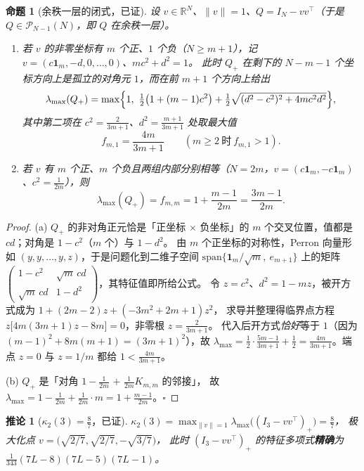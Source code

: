 \documentclass[UTF8,11pt]{ctexart}
\newtheorem{proposition}[theorem]{命题}
\newtheorem{corollary}[theorem]{推论}
\theoremstyle{definition}
\newcommand{\R}{\mathbb{R}}
\newcommand{\one}{\mathbf{1}}
\begin{document}
\begin{proposition}[余秩一层的闭式，已证]\label{prop:corank1}
设 $v\in\R^N$、$\|v\|=1$、$Q=I_N-vv^\top$（于是 $Q\in\mathcal P_{N-1}(N)$，即 $Q$ 在余秩一层）。
\begin{enumerate}[label=(\alph*),leftmargin=2.2em]
\item 若 $v$ 的非零坐标有 $m$ 个正、$1$ 个负（$N\ge m+1$），记 $v=(c\one_m,-d,0,\dots,0)$、$mc^2+d^2=1$。
此时 $Q_+$ 在剩下的 $N-m-1$ 个坐标方向上是孤立的对角元 $1$，而在前 $m+1$ 个方向上给出
\[
\lambda_{\max}(Q_+)=\max\Bigl\{1,\ \tfrac12\bigl(1+(m-1)c^2\bigr)+\tfrac12\sqrt{(d^2-c^2)^2+4mc^2d^2}\Bigr\},
\]
其中第二项在 $c^2=\frac2{3m+1}$、$d^2=\frac{m+1}{3m+1}$ 处取最大值
\begin{equation}\label{eq:fm1}
f_{m,1}=\frac{4m}{3m+1}\qquad(m\ge2\ \text{时}\ f_{m,1}>1).
\end{equation}
\item 若 $v$ 有 $m$ 个正、$m$ 个负且两组内部分别相等（$N=2m$，$v=(c\one_m,-c\one_m)$、$c^2=\frac1{2m}$），则
\begin{equation}\label{eq:fmm}
\lambda_{\max}(Q_+)=f_{m,m}=1+\frac{m-1}{2m}=\frac{3m-1}{2m}.
\end{equation}
\end{enumerate}
\end{proposition}

\begin{proof}
(a) $Q_+$ 的非对角正元恰是「正坐标 $\times$ 负坐标」的 $m$ 个交叉位置，值都是 $cd$；对角是 $1-c^2$（$m$ 个）与 $1-d^2$。
由 $m$ 个正坐标的对称性，Perron 向量形如 $(y,y,\dots,y,z)$，于是问题化到二维子空间
$\mathrm{span}\{\one_m/\sqrt m,\ e_{m+1}\}$ 上的矩阵
$\begin{pmatrix}1-c^2&\sqrt m\,cd\\ \sqrt m\,cd&1-d^2\end{pmatrix}$，其特征值即所给公式。
令 $z=c^2$、$d^2=1-mz$，被开方式成为 $1+(2m-2)z+(-3m^2+2m+1)z^2$，
求导并整理得临界点方程 $z\bigl[4m(3m+1)z-8m\bigr]=0$，非零根 $z=\frac2{3m+1}$。
代入后开方式\emph{恰好}等于 $1$（因为 $(m-1)^2+8m(m+1)=(3m+1)^2$），故
$\lambda_{\max}=\frac12\cdot\frac{5m-1}{3m+1}+\frac12=\frac{4m}{3m+1}$。端点 $z=0$ 与 $z=1/m$ 都给 $1<\frac{4m}{3m+1}$。

(b) $Q_+$ 是「对角 $1-\frac1{2m}$ $+$ $\frac1{2m}K_{m,m}$ 的邻接」，
故 $\lambda_{\max}=1-\frac1{2m}+\frac1{2m}\cdot m=1+\frac{m-1}{2m}$。$\square$
\end{proof}

\begin{corollary}[$\kappa_2(3)=\frac87$，已证]\label{cor:k23}
$\kappa_2(3)=\max_{\|v\|=1}\lambda_{\max}\bigl((I_3-vv^\top)_+\bigr)=\frac87$，
极大化点 $v=\bigl(\sqrt{2/7},\sqrt{2/7},-\sqrt{3/7}\bigr)$，
此时 $(I_3-vv^\top)_+$ 的特征多项式\textbf{精确}为 $\frac1{343}(7L-8)(7L-5)(7L-1)$。
\end{corollary}
\end{document}
